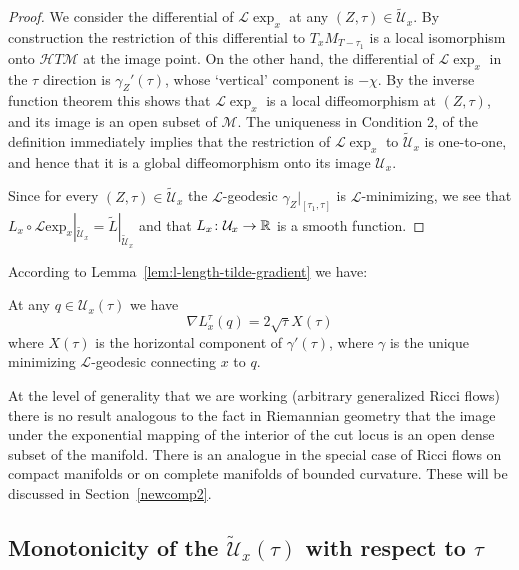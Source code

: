 \begin{proof}
\sketch
{}
We consider the differential of ${\mathcal L}\exp_x$ at any
 $(Z,\tau)\in\widetilde {\mathcal U}_x$. By construction
 the restriction of this differential to $T_xM_{T-\tau_1}$ is a local
 isomorphism onto ${\mathcal H}T{\mathcal M}$ at the image point. On the other
 hand, the differential of ${\mathcal L}\exp_x$ in the $\tau$
 direction is $\gamma_Z'(\tau)$, whose `vertical' component is
 $-\chi$. By the inverse function theorem this
 shows that ${\mathcal L}\exp_x$ is a local diffeomorphism at
 $(Z,\tau)$, and
 its image is an open subset of ${\mathcal M}$.
The uniqueness in Condition 2, of the definition immediately implies
that the restriction of ${\mathcal L}\exp_x$ to
$\widetilde{\mathcal U}_x$ is one-to-one, and hence that it is a
global diffeomorphism onto its image ${\mathcal U}_x$.

Since for every $(Z,\tau)\in\widetilde{\mathcal U}_x$ the ${\mathcal
L}$-geodesic  $\gamma_Z|_{[\tau_1,\tau]}$ is ${\mathcal
L}$-minimizing, we see that $L_x\circ {\mathcal L}\mathrm{exp}_x|_{\widetilde{\mathcal U}_x}=\widetilde L|_{\widetilde
{\mathcal U}_x}$ and that $L_x\colon {\mathcal U}_x\to \mathbb{R}$ is a
smooth function.
\end{proof}

According to Lemma~\ref{lem:l-length-tilde-gradient} we have:

\begin{corollary}\label{cor:l-length-gradient}
\label{DL}

At any $q\in {\mathcal U}_x(\tau)$ we have
$$\nabla L_x^{\tau}(q)=2\sqrt{\tau}X(\tau)$$
where  $X(\tau)$ is the horizontal component of $\gamma'(\tau)$,
where $\gamma$ is the unique minimizing ${\mathcal L}$-geodesic
connecting $x$  to $q$.
\end{corollary}

At the level of generality that we are working (arbitrary
generalized Ricci flows) there is no result analogous to the fact in
Riemannian geometry that the image under the exponential mapping of
the interior of the cut locus is an open dense subset of the
manifold. There is an analogue in the special case of Ricci flows on
compact manifolds or on complete manifolds of bounded curvature.
These will be discussed in Section~\ref{newcomp2}.





\subsection{Monotonicity of the $\widetilde{\mathcal U}_x(\tau)$ with respect to
$\tau$}



